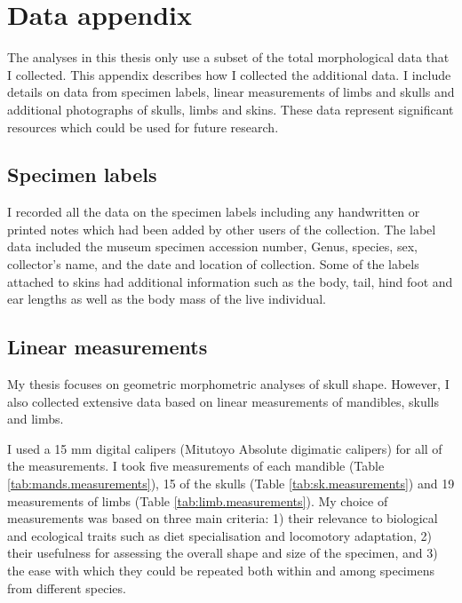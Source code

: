 

\chapter{Data appendix}
\label{appendix}

	The analyses in this thesis only use a subset of the total morphological data that I collected. This appendix describes how I collected the additional data. I include details on data from specimen labels, linear measurements of limbs and skulls and additional photographs of skulls, limbs and skins. These data represent significant resources which could be used for future research.

\section{Specimen labels}

	I recorded all the data on the specimen labels including any handwritten or printed notes which had been added by other users of the collection. The label data included the museum specimen accession number, Genus, species, sex, collector's name, and the date and location of collection. Some of the labels attached to skins had additional information such as the body, tail, hind foot and ear lengths as well as the body mass of the live individual. 
\section{Linear measurements}
\label{sect:measurements}

	My thesis focuses on geometric morphometric analyses of skull shape. However, I also collected extensive data based on linear measurements of mandibles, skulls and limbs. 
	
	I used a 15 mm digital calipers (Mitutoyo Absolute digimatic calipers) for all of the measurements. I took five measurements of each mandible (Table \ref{tab:mands.measurements}), 15 of the skulls (Table \ref{tab:sk.measurements}) and 19 measurements of limbs (Table \ref{tab:limb.measurements}). My choice of  measurements was based on three main criteria: 1) their relevance to biological and ecological traits such as diet specialisation and locomotory adaptation, 2) their usefulness for assessing the overall shape and size of the specimen, and 3) the ease with which they could be repeated both within and among specimens from different species. 

